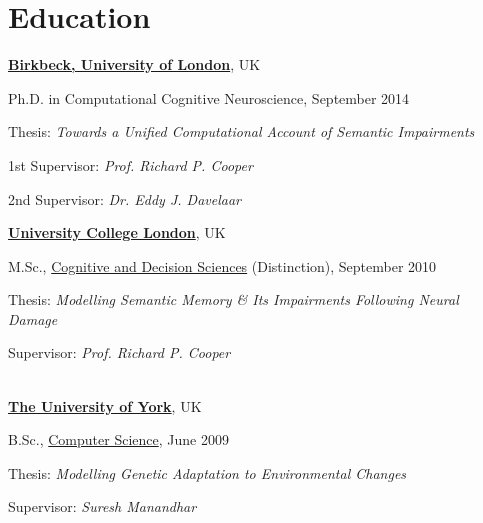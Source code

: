 \section{Education}
%
\href{http://www.bbk.ac.uk/}{\textbf{Birkbeck, University of London}},
UK
\begin{outerlist}
 \item[] Ph.D. in Computational Cognitive Neuroscience, September  2014
        \begin{innerlist}
        \item Thesis: \emph{Towards a Unified Computational Account of Semantic Impairments}
	\item 1st Supervisor: \emph{Prof. Richard P. Cooper}
	\item 2nd Supervisor: \emph{Dr. Eddy J. Davelaar}

        \end{innerlist}

\end{outerlist}
\blankline

\href{http://www.ucl.ac.uk/}{\textbf{University College London}},
UK
\begin{outerlist}
 \item[] M.Sc., 
        \href{http://www.ucl.ac.uk/lifesciences-faculty/degree-programmes/cognitive-decision-sciences}
             {Cognitive and Decision Sciences} (Distinction), September 2010
        \begin{innerlist}
        \item Thesis: \emph{Modelling Semantic Memory \& Its Impairments Following Neural Damage}

	\item Supervisor: \emph{Prof. Richard P. Cooper}

        \end{innerlist}

\end{outerlist}

\ \\
\href{http://www.york.ac.uk/}{\textbf{The University of York}},
UK
\begin{outerlist}

\item[] B.Sc.,
        \href{http://www.cs.york.ac.uk/}
             {Computer Science}, June 2009
        \begin{innerlist}
        \item Thesis: \emph{Modelling Genetic Adaptation to Environmental Changes}
	\item Supervisor: \emph{Suresh Manandhar}
        \end{innerlist}


\end{outerlist}

